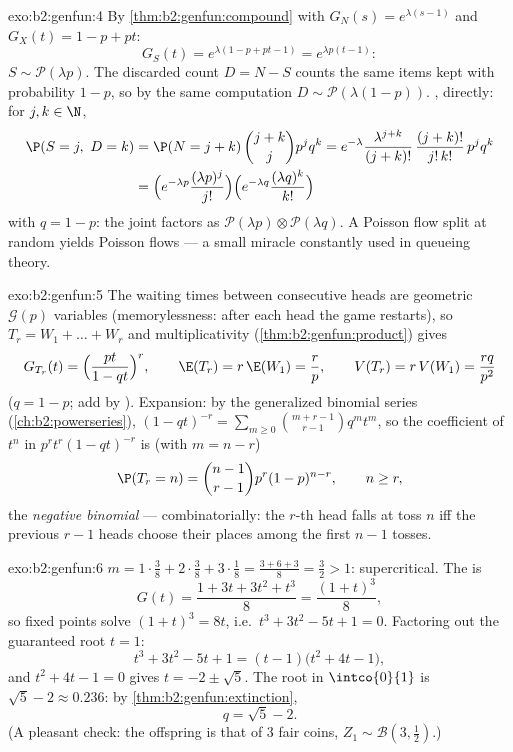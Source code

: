\begin{solution}{exo:b2:genfun:4}
By \cref{thm:b2:genfun:compound} with $G_N(s) = e^{\lambda(s-1)}$
and $G_X(t) = 1 - p + pt$:
\[
G_S(t) = e^{\lambda(1 - p + pt - 1)} = e^{\lambda p(t - 1)} :
\]
$S \sim \mathcal{P}(\lambda p)$. The discarded count $D = N - S$
counts the same items kept with probability $1 - p$, so by the
same computation $D \sim \mathcal{P}(\lambda(1 - p))$.
, directly: for $j, k \in \N$,
\begin{align*}
\P(S = j,\ D = k)
&= \P(N = j + k)\,\binom{j+k}{j}p^jq^k
= e^{-\lambda}\frac{\lambda^{j+k}}{(j+k)!}\,
\frac{(j+k)!}{j!\,k!}\,p^jq^k\\
&= \Bigl(e^{-\lambda p}\frac{(\lambda p)^j}{j!}\Bigr)
\Bigl(e^{-\lambda q}\frac{(\lambda q)^k}{k!}\Bigr)
\end{align*}
with $q = 1 - p$: the joint  factors as
$\mathcal{P}(\lambda p) \otimes \mathcal{P}(\lambda q)$. A Poisson
flow split at random yields \emph{} Poisson flows ---
a small miracle constantly used in queueing theory.
\end{solution}

\begin{solution}{exo:b2:genfun:5}
The waiting times between consecutive heads are 
geometric $\mathcal{G}(p)$ variables (memorylessness: after each
head the game restarts), so $T_r = W_1 + \dots + W_r$ and
multiplicativity (\cref{thm:b2:genfun:product}) gives
\[
G_{T_r}(t) = \Bigl(\frac{pt}{1 - qt}\Bigr)^{r},
\qquad
\E(T_r) = r\,\E(W_1) = \frac rp,
\qquad
V(T_r) = r\,V(W_1) = \frac{rq}{p^2}
\]
($q = 1 - p$;  add by ). Expansion: by the
generalized binomial series
(\cref{ch:b2:powerseries}), $(1 - qt)^{-r} = \sum_{m\geq0}
\binom{m + r - 1}{r - 1}q^mt^m$, so the coefficient of $t^n$ in
$p^rt^r(1 - qt)^{-r}$ is (with $m = n - r$)
\[
\P(T_r = n) = \binom{n-1}{r-1}p^r(1-p)^{n-r},
\qquad n \geq r ,
\]
the \emph{negative binomial}  --- combinatorially: the $r$-th
head falls at toss $n$ iff the previous $r - 1$ heads choose their
places among the first $n - 1$ tosses.
\end{solution}

\begin{solution}{exo:b2:genfun:6}
$m = 1\cdot\frac38 + 2\cdot\frac38 + 3\cdot\frac18 = \frac{3 + 6 +
3}{8} = \frac32 > 1$: supercritical. The  is
\[
G(t) = \frac{1 + 3t + 3t^2 + t^3}{8} = \frac{(1 + t)^3}{8} ,
\]
so fixed points solve $(1 + t)^3 = 8t$, i.e.\ $t^3 + 3t^2 - 5t + 1
= 0$. Factoring out the guaranteed root $t = 1$:
\[
t^3 + 3t^2 - 5t + 1 = (t - 1)\bigl(t^2 + 4t - 1\bigr),
\]
and $t^2 + 4t - 1 = 0$ gives $t = -2 \pm \sqrt5$. The root in
$\intco{0}{1}$ is $\sqrt5 - 2 \approx 0.236$: by
\cref{thm:b2:genfun:extinction},
\[
q = \sqrt 5 - 2 .
\]
(A pleasant check: the offspring  is that of $3$ 
fair coins, $Z_1 \sim \mathcal{B}(3, \frac12)$.)
\end{solution}

